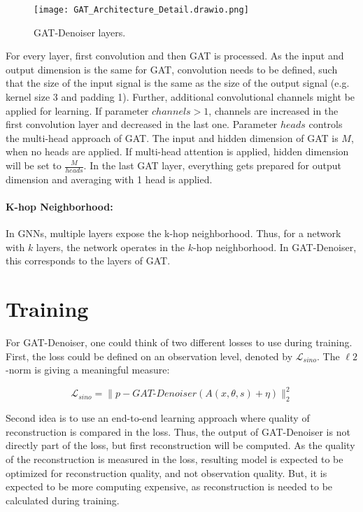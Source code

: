 \begin{figure}[H]
  \centering
  \texttt{[image: GAT\_Architecture\_Detail.drawio.png]}
  \caption{GAT-Denoiser layers.}
  \label{fig:architecture-detailed}
\end{figure}


For every layer, first convolution and then GAT is processed. 
As the input and output dimension is the same for GAT,
convolution needs to be defined, such that the size of the input signal is the same as the size of the output signal
(e.g. kernel size 3 and padding 1).
Further, additional convolutional channels might be applied for learning.
If parameter $channels > 1$, channels are increased in the first convolution layer 
and decreased in the last one.
Parameter $heads$ controls the multi-head approach of GAT. The input and hidden dimension
of GAT is $M$, when no heads are applied.
If multi-head attention is applied, hidden dimension will be set to $\frac{M}{heads}$.
In the last GAT layer, everything gets prepared for output dimension and 
averaging with 1 head is applied.

\paragraph{K-hop Neighborhood:}
In GNNs, multiple layers expose the k-hop neighborhood. Thus, for a network with $k$ layers,
the network operates in the $k$-hop neighborhood. In GAT-Denoiser, this corresponds
to the layers of GAT.

\section{Training}

For GAT-Denoiser, one could think of two different losses to use during training.
First, the loss could be defined on an observation level, denoted by $\mathcal{L}_{sino}$. 
The $\ell2$-norm is giving a meaningful measure:

\begin{equation}
  \label{eq:loss_sino}
  \mathcal{L}_{sino} = \parallel p - \textit{GAT-Denoiser}(A(x, \theta, s) + \eta) \parallel ^2_2
\end{equation}

Second idea is to use an end-to-end learning approach where quality of reconstruction is 
compared in the loss. Thus, the output of GAT-Denoiser is not directly part of the loss, but first reconstruction will be computed.
As the quality of the reconstruction is measured in the loss, resulting model is expected to be optimized
for reconstruction quality, and not observation quality. But, it is expected to be more computing expensive,
as reconstruction is needed to be calculated during training.

